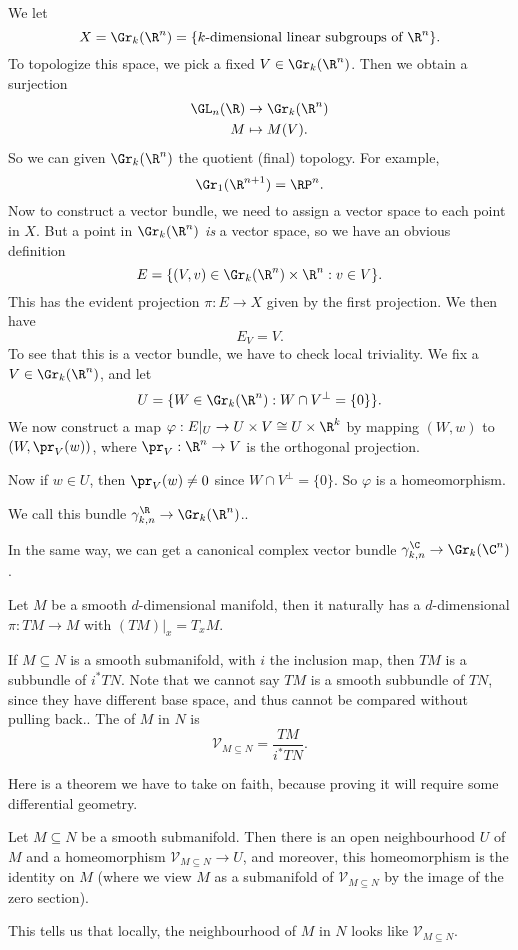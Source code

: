 \documentclass[a4paper]{article}
\begin{document}
\begin{eg}
  We let
  \[
    X = \Gr_k(\R^n) = \{k\text{-dimensional linear subgroups of $\R^n$}\}.
  \]
  To topologize this space, we pick a fixed $V \in \Gr_k(\R^n)$. Then we obtain a surjection
  \begin{align*}
    \GL_n(\R) &\to \Gr_k(\R^n)\\
    M &\mapsto M(V).
  \end{align*}
  So we can given $\Gr_k(\R^n)$ the quotient (final) topology. For example,
  \[
    \Gr_1(\R^{n + 1}) = \RP^n.
  \]
  Now to construct a vector bundle, we need to assign a vector space to each point in $X$. But a point in $\Gr_k(\R^n)$ \emph{is} a vector space, so we have an obvious definition
  \[
    E = \{(V, v) \in \Gr_k(\R^n) \times \R^n: v \in V\}.
  \]
  This has the evident projection $\pi: E \to X$ given by the first projection. We then have
  \[
    E_V = V.
  \]
  To see that this is a vector bundle, we have to check local triviality. We fix a $V \in \Gr_k(\R^n)$, and let
  \[
    U = \{W \in\Gr_k(\R^n): W \cap V^\perp = \{0\}\}.
  \]
  We now construct a map $\varphi: E|_U \to U \times V \cong U \times \R^k$ by mapping $(W, w)$ to $(W, \pr_V(w))$, where $\pr_V: \R^n \to V$ is the orthogonal projection.

  Now if $w \in U$, then $\pr_V(w) \not= 0$ since $W \cap V^\perp = \{0\}$. So $\varphi$ is a homeomorphism.

  We call this bundle $\gamma_{k, n}^\R \to \Gr_k(\R^n)$..
\end{eg}

In the same way, we can get a canonical complex vector bundle $\gamma_{k, n}^\C \to \Gr_k(\C^n)$.

\begin{eg}
  Let $M$ be a smooth $d$-dimensional manifold, then it naturally has a $d$-dimensional  $\pi: TM \to M$ with $(TM)|_x = T_x M$.

  If $M \subseteq N$ is a smooth submanifold, with $i$ the inclusion map, then $TM$ is a subbundle of $i^* TN$. Note that we cannot say $TM$ is a smooth subbundle of $TN$, since they have different base space, and thus cannot be compared without pulling back..
  The  of $M$ in $N$ is
  \[
    \mathcal{V}_{M \subseteq N} = \frac{TM}{i^*TN}.
  \]
\end{eg}

Here is a theorem we have to take on faith, because proving it will require some differential geometry.
\begin{thm}
  Let $M \subseteq N$ be a smooth submanifold. Then there is an open neighbourhood $U$ of $M$ and a homeomorphism $\mathcal{V}_{M \subseteq N} \to U$, and moreover, this homeomorphism is the identity on $M$ (where we view $M$ as a submanifold of $\mathcal{V}_{M \subseteq N}$ by the image of the zero section).
\end{thm}
This tells us that locally, the neighbourhood of $M$ in $N$ looks like $\mathcal{V}_{M \subseteq N}$.
\end{document}
